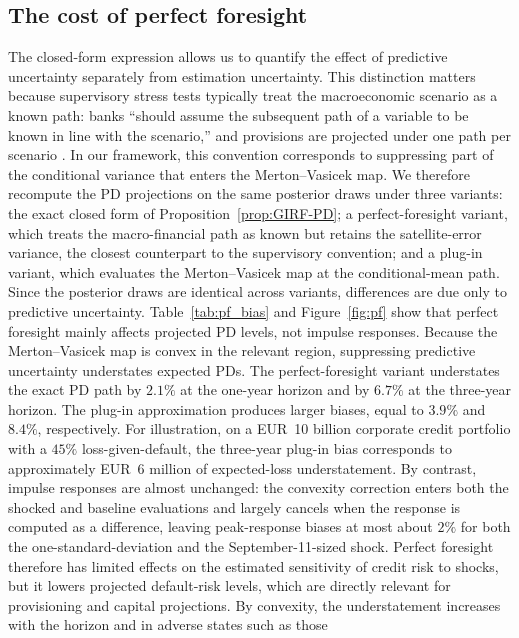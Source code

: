 \subsection{The cost of perfect foresight}
\label{sec:perfect_foresight}
The closed-form expression allows us to quantify the effect of predictive
uncertainty separately from estimation uncertainty. This distinction matters
because supervisory stress tests typically treat the macroeconomic scenario
as a known path: banks ``should assume the subsequent path of a variable to
be known in line with the scenario,'' and provisions are projected under one
path per scenario \citep[Box~1, paragraphs~130 and~136]{EBA2025method}. In
our framework, this convention corresponds to suppressing part of the
conditional variance that enters the Merton--Vasicek map. We therefore
recompute the PD projections on the same posterior draws under three
variants: the exact closed form of Proposition~\ref{prop:GIRF-PD}; a
perfect-foresight variant, which treats the macro-financial path as known but
retains the satellite-error variance, the closest counterpart to the
supervisory convention; and a plug-in variant, which evaluates the
Merton--Vasicek map at the conditional-mean path. Since the posterior draws
are identical across variants, differences are due only to predictive
uncertainty.
Table~\ref{tab:pf_bias} and Figure~\ref{fig:pf} show that perfect foresight
mainly affects projected PD levels, not impulse responses. Because the
Merton--Vasicek map is convex in the relevant region, suppressing predictive
uncertainty understates expected PDs. The perfect-foresight variant
understates the exact PD path by $2.1\%$ at the one-year horizon and by
$6.7\%$ at the three-year horizon. The plug-in approximation produces larger
biases, equal to $3.9\%$ and $8.4\%$, respectively. For illustration, on a
EUR~10 billion corporate credit portfolio with a $45\%$ loss-given-default,
the three-year plug-in bias corresponds to approximately EUR~6 million of
expected-loss understatement. By contrast, impulse responses are almost
unchanged: the convexity correction enters both the shocked and baseline
evaluations and largely cancels when the response is computed as a
difference, leaving peak-response biases at most about $2\%$ for both the
one-standard-deviation and the September-11-sized shock. Perfect foresight
therefore has limited effects on the estimated sensitivity of credit risk to
shocks, but it lowers projected default-risk levels, which are directly
relevant for provisioning and capital projections. By convexity, the
understatement increases with the horizon and in adverse states such as those
